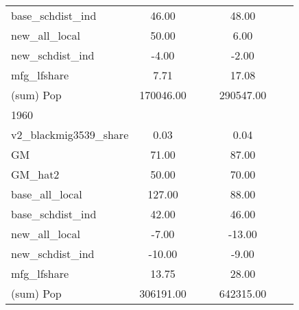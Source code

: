 \begin{table}[htbp]
\begin{tabular}{l*{2}{ccc}}
base\_schdist\_ind    &       46.00&            &            &       48.00&            &            \\
new\_all\_local       &       50.00&            &            &        6.00&            &            \\
new\_schdist\_ind     &       -4.00&            &            &       -2.00&            &            \\
mfg\_lfshare         &        7.71&            &            &       17.08&            &            \\
(sum) Pop           &   170046.00&            &            &   290547.00&            &            \\
\midrule
1960                &            &            &            &            &            &            \\
v2\_blackmig3539\_share&        0.03&            &            &        0.04&            &            \\
GM                  &       71.00&            &            &       87.00&            &            \\
GM\_hat2             &       50.00&            &            &       70.00&            &            \\
base\_all\_local      &      127.00&            &            &       88.00&            &            \\
base\_schdist\_ind    &       42.00&            &            &       46.00&            &            \\
new\_all\_local       &       -7.00&            &            &      -13.00&            &            \\
new\_schdist\_ind     &      -10.00&            &            &       -9.00&            &            \\
mfg\_lfshare         &       13.75&            &            &       28.00&            &            \\
(sum) Pop           &   306191.00&            &            &   642315.00&            &            \\
\bottomrule
\end{tabular}
\end{table}
